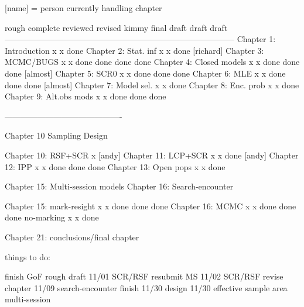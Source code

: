 [name] = person currently handling chapter


                          rough   complete reviewed  revised kimmy final 
                          draft    draft                           draft
------------------------------------------------------------------------------------
Chapter 1: Introduction       x       x     done    
Chapter 2: Stat. inf          x       x     done    [richard]
Chapter 3: MCMC/BUGS          x       x     done     done    done   done
Chapter 4: Closed models      x       x     done     done    done   [almost]
Chapter 5: SCR0               x       x     done     done    done
Chapter 6: MLE                x       x     done     done    done   [almost]
Chapter 7: Model sel.         x       x     done   
Chapter 8: Enc. prob          x       x     done
Chapter 9: Alt.obs mods       x       x     done     done    done

-------------------------------------------

Chapter 10 Sampling Design

Chapter 10: RSF+SCR           x    [andy]
Chapter 11: LCP+SCR           x       x     done    [andy]
Chapter 12: IPP               x       x     done     done           done
Chapter 13: Open pops         x       x     done 

Chapter 15: Multi-session models
Chapter 16: Search-encounter

Chapter 15: mark-resight      x       x     done     done           done
Chapter 16: MCMC              x       x     done     done           done
no-marking                    x       x     done

Chapter 21: conclusions/final chapter





things to do:

finish GoF rough draft   11/01
SCR/RSF resubmit MS      11/02
SCR/RSF revise chapter   11/09
search-encounter finish  11/30
design                   11/30
effective sample area  
multi-session
